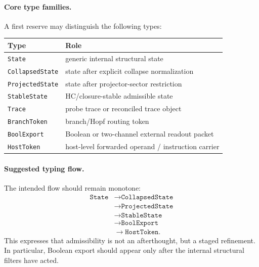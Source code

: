 \paragraph{Core type families.}
A first reserve may distinguish the following types:
\begin{center}
\begin{tabular}{@{}ll@{}}
\toprule
Type & Role \\
\midrule
\texttt{State} & generic internal structural state \\
\texttt{CollapsedState} & state after explicit collapse normalization \\
\texttt{ProjectedState} & state after projector-sector restriction \\
\texttt{StableState} & HC/closure-stable admissible state \\
\texttt{Trace} & probe trace or reconciled trace object \\
\texttt{BranchToken} & branch/Hopf routing token \\
\texttt{BoolExport} & Boolean or two-channel external readout packet \\
\texttt{HostToken} & host-level forwarded operand / instruction carrier \\
\bottomrule
\end{tabular}
\end{center}

\paragraph{Suggested typing flow.}
The intended flow should remain monotone:
\[
\begin{aligned}
\texttt{State}
&\to \texttt{CollapsedState}\\
&\to \texttt{ProjectedState}\\
&\to \texttt{StableState}\\
&\to \texttt{BoolExport}\\
&\to \texttt{HostToken}.
\end{aligned}
\]
This expresses that admissibility is not an afterthought, but a staged refinement. In particular, Boolean export should appear only after the internal structural filters have acted.

